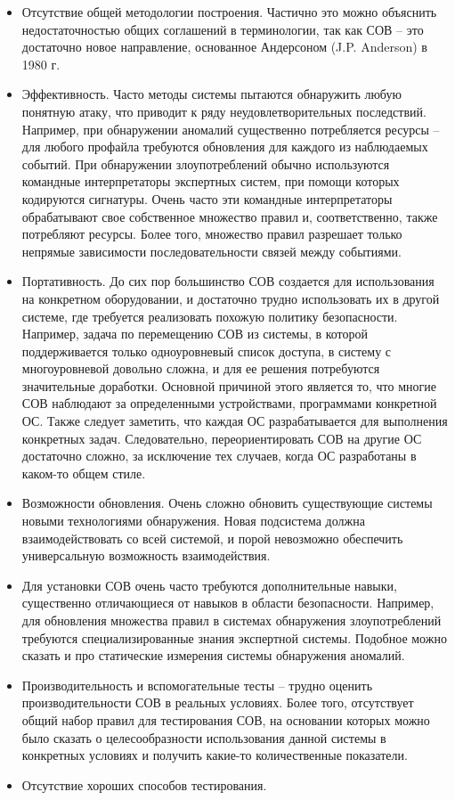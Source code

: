 \begin{itemize}
	\item Отсутствие общей методологии построения. Частично это можно объяснить недостаточностью общих соглашений в терминологии, так как СОВ – это достаточно новое направление, основанное Андерсоном (J.P. Anderson) в 1980 г.
	\item Эффективность. Часто методы системы пытаются обнаружить любую понятную атаку, что приводит к ряду неудовлетворительных последствий. Например, при обнаружении аномалий существенно потребляется ресурсы – для любого профайла требуются обновления для каждого из наблюдаемых событий. При обнаружении злоупотреблений обычно используются командные интерпретаторы экспертных систем, при помощи которых кодируются сигнатуры. Очень часто эти командные интерпретаторы обрабатывают свое собственное множество правил и, соответственно, также потребляют ресурсы. Более того, множество правил разрешает только непрямые зависимости последовательности связей между событиями.
	\item Портативность. До сих пор большинство СОВ создается для использования на конкретном оборудовании, и достаточно трудно использовать их в другой системе, где требуется реализовать похожую политику безопасности. Например, задача по перемещению СОВ из системы, в которой поддерживается только одноуровневый список доступа, в систему с многоуровневой довольно сложна, и для ее решения потребуются значительные доработки. Основной причиной этого является то, что многие СОВ наблюдают за определенными устройствами, программами конкретной ОС. Также следует заметить, что каждая ОС разрабатывается для выполнения конкретных задач. Следовательно, переориентировать СОВ на другие ОС достаточно сложно, за исключение тех случаев, когда ОС разработаны в каком-то общем стиле.
	\item Возможности обновления. Очень сложно обновить существующие системы новыми технологиями обнаружения. Новая подсистема должна взаимодействовать со всей системой, и порой невозможно обеспечить универсальную возможность взаимодействия.
	\item Для установки СОВ очень часто требуются дополнительные навыки, существенно отличающиеся от навыков в области безопасности. Например, для обновления множества правил в системах обнаружения злоупотреблений требуются специализированные знания экспертной системы. Подобное можно сказать и про статические измерения системы обнаружения аномалий.
	\item Производительность и вспомогательные тесты – трудно оценить производительности СОВ в реальных условиях. Более того, отсутствует общий набор правил для тестирования СОВ, на основании которых можно было сказать о целесообразности использования данной системы в конкретных условиях и получить какие-то количественные показатели.
	\item Отсутствие хороших способов тестирования.
	
\end{itemize}

